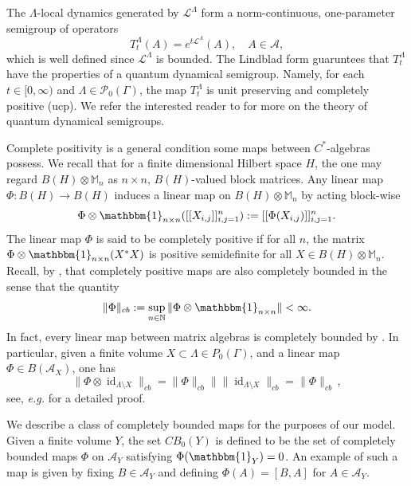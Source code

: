 \documentclass{article}
\DeclareMathOperator{\id}{id}
\newcommand{\M}{\mathbb{M}}
\newcommand{\one}{\mathbbm{1}}
\newcommand{\<}{\langle}
\renewcommand{\>}{\rangle}
\numberwithin{equation}{section}
\theoremstyle{definition}
\begin{document}
The $\Lambda$-local dynamics generated by $\mathscr{L}^\Lambda$ form a norm-continuous, one-parameter semigroup of operators \begin{equation} T^{\Lambda}_t(A) = e^{t\mathscr{L}^{\Lambda}}(A), \quad A\in \mathcal{A}, \end{equation} which is well defined since $\mathscr{L}^{\Lambda}$ is bounded. The Lindblad form guaruntees that $T^{\Lambda}_t$ have the properties of a quantum dynamical semigroup. Namely, for each $t\in [0, \infty)$ and $\Lambda \in \mathscr{P}_0(\Gamma)$, the map $T_t^{\Lambda}$ is unit preserving and completely positive (ucp). We refer the interested reader to \cite{AlickiFannes, AlickiLendi} for more on the theory of quantum dynamical semigroups. 

Complete positivity is a general condition some maps between $C^*$-algebras possess. We recall that for a finite dimensional Hilbert space $H$, the one may regard $B(H) \otimes \M_n$ as $n\times n$, $B(H)$-valued block matrices.   Any linear map $\Phi:B(H) \to B(H)$ induces a linear map on $B(H)\otimes \M_n$ by acting block-wise \begin{equation} \Phi\otimes \one_{n\times n} ( [[X_{i,j}]]_{i,j=1}^n ) := [[ \Phi(X_{i,j})]]_{i,j=1}^n. \end{equation} The linear map $\Phi$ is said to be completely positive if for all $n$, the matrix $\Phi \otimes \one_{n\times n}(X^*X)$ is positive semidefinite for all $X\in B(H) \otimes \M_n$. 
Recall, by \cite[Proposition 3.6]{Paulsen}, that completely positive maps are also completely bounded in the sense that the quantity \begin{equation} \|\Phi\|_{cb}:= \sup_{n\in \mathbb{N}} \|\Phi\otimes \one_{n\times n}\| <\infty. \end{equation} In fact, every linear map between matrix algebras is completely bounded by \cite[Proposition 8.11]{Paulsen}. In particular, given a finite volume $X\subset \Lambda \in P_0(\Gamma)$, and a linear map $\Phi \in B(\mathcal{A}_X)$, one has
\begin{equation}
	\|\Phi \otimes \id_{\Lambda\setminus X}\|_{cb} = \|\Phi\|_{cb} \|\|\id_{\Lambda \setminus X}\|_{cb} = \|\Phi\|_{cb}\,,
\end{equation}  see, \textit{e.g.} \cite[Corollary 3.5.5]{BrownOzawa} for a detailed proof.


We describe a class of completely bounded maps for the purposes of our model.  Given a finite volume $Y$, the set $CB_0(Y)$ is defined to be the set of completely bounded maps $\Phi$ on $\mathcal{A}_Y$ satisfying $\Phi(\one_Y) = 0$. An example of such a map is given by fixing $B\in \mathcal{A}_Y$ and defining $\Phi(A) = [B, A]$ for $A\in \mathcal{A}_Y$. 
\end{document}
